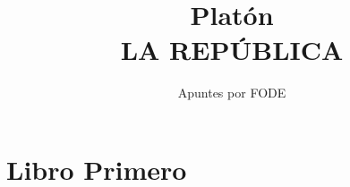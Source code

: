 \documentclass[10pt]{book}
\begin{document}
\normalfont

\author{\Large Apuntes por FODE}
\title{\small Platón \\ \vspace{1cm} \large LA REPÚBLICA}
\date{}
\pagestyle{empty}
\maketitle
\thispagestyle{empty}
\let\cleardoublepage\clearpage
\tableofcontents								%


 
\let\cleardoublepage\clearpage


\chapter*{Libro Primero}
\end{document}
